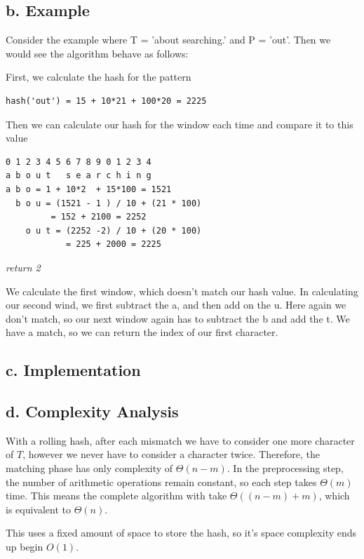 \documentclass{chi2005}
\begin{document}
\subsection{b. Example}

Consider the example where T = 'about searching.' and P = 'out'. Then we would see the algorithm behave as follows:

First, we calculate the hash for the pattern
\begin{verbatim}
hash('out') = 15 + 10*21 + 100*20 = 2225
\end{verbatim}

Then we can calculate our hash for the window each time and compare it to this value

\begin{verbatim}
0 1 2 3 4 5 6 7 8 9 0 1 2 3 4
a b o u t   s e a r c h i n g
a b o = 1 + 10*2  + 15*100 = 1521
  b o u = (1521 - 1 ) / 10 + (21 * 100)
  	     = 152 + 2100 = 2252
    o u t = (2252 -2) / 10 + (20 * 100) 
         	= 225 + 2000 = 2225
\end{verbatim}

\emph{return 2}

We calculate the first window, which doesn't match our hash value. In calculating our second wind, we first subtract the a, and then add on the u. Here again we don't match, so our next                          
window again has to subtract the b and add the t. We have a match, so we can return the index of our first character.

\subsection{c. Implementation}

\subsection{d. Complexity Analysis }

With a rolling hash, after each mismatch we have to consider one more character of $T$, however we never have to consider a character twice. Therefore, the matching phase has only complexity of $\Theta(n-m)$. In the preprocessing step, the number of arithmetic operations remain constant, so each step takes $\Theta(m)$ time. This means the complete algorithm with take $\Theta((n-m) + m)$, which is equivalent to $\Theta(n)$.

This uses a fixed amount of space to store the hash, so it's space complexity ends up begin $O(1)$.
\end{document}
